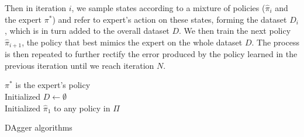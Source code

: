 \documentclass[twoside,11pt]{article}
\begin{document}
Then in iteration $i$, we sample states according to a mixture of policies ($\hat{\pi}_i$ and the expert $\pi^*$) and refer to expert's action on these states, forming the dataset $D_i$, which is in turn added to the overall dataset $D$. We then train the next policy $\hat{\pi}_{i+1}$, the policy that best mimics the expert on the whole dataset $D$. The process is then repeated to further rectify the error produced by the policy learned in the previous iteration until we reach iteration $N$.











\begin{algorithm}[htb]
 \label{alg:DAgger}
 $\pi^*$  is the expert’s policy \\
 Initialized $D \leftarrow \emptyset$ \\
 Initialized $\hat{\pi}_1$ to any policy in $\Pi$ \\
 \caption{DAgger algorithms}
\end{algorithm}
\end{document}
